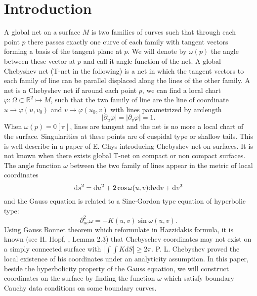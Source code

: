 \documentclass{article}
\newcommand{\R}{\mathbb{R}}
\theoremstyle{remark}
\theoremstyle{prpart}
\begin{document}
 \section{Introduction}
A global net on a surface $M$ is two families of curves such that through each point $p$ there passes exactly one curve of
each family with tangent vectors forming a basis of the tangent plane at $p$. We will denote by $\omega (p)$ the angle between
these vector at $p$ and call it angle function of the net. A global Chebyshev net (T-net in the following) is a net in which the tangent vectors to each family of line can be parallel displaced along the lines of the other family. A net is a Chebyshev net if around each point $p$, we can find a local chart
$\varphi : \Omega \subset \R^2 \mapsto M$, such that the two family of line are the line of coordinate $u \to \varphi (u, v_0)$
and $v \to \varphi (u_0, v)$ with lines parametrized by arclength
$$| \partial _u \varphi | = | \partial _v \varphi | =1.$$
When $\omega (p)=0 [\pi]$, lines are tangent and the net is no more a local chart of the surface. Singularities at these points
are of cuspidal type or shallow tails. This is well describe in a paper of E. Ghys \cite{Ghys09} introducing Chebyshev net on surfaces. It is not known
when there exists global T-net on compact or non compact surfaces. The angle function $\omega$ between the two family of lines appear in the metric
of local coordinates
$${\rm d}s^2={\rm d}u^2 +  2\cos \omega (u,v) {\rm d}u {\rm d}v + {\rm d}v^2$$
and the Gauss equation is related to a Sine-Gordon type equation of hyperbolic type:
$$\partial ^2 _{uv} \omega = -K(u,v) \sin  \omega (u,v).$$
Using Gauss Bonnet theorem which reformulate in Hazzidakis formula, it is known (see H. Hopf, \cite{HH}, Lemma 2.3) that Chebyschev
coordinates may not exist on a simply connected surface with $|\int \int K dS | \geq 2 \pi$. 
P. L. Chebyshev proved the local existence of his coordinates under an analyticity assumption. In this paper, beside the hyperbolicity property of
the Gauss equation, we will construct coordinates on the surface by finding the function $\omega$ which satisfy boundary Cauchy data conditions
on some boundary curves.
\end{document}
